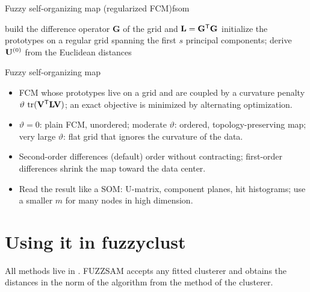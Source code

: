 \begin{algobox}{Fuzzy self-organizing map (regularized FCM)}{fsom}
\begin{algorithm}[H]
build the difference operator $\mathbf{G}$ of the grid and $\mathbf{L}=\mathbf{G}^{\mathsf{T}}\mathbf{G}$\;
initialize the prototypes on a regular grid spanning the first $s$ principal components; derive $\mathbf{U}^{(0)}$ from the Euclidean distances\;
\end{algorithm}
\end{algobox}
\begin{summarybox}{Fuzzy self-organizing map}
\begin{itemize}
  \item FCM whose prototypes live on a grid and are coupled by a curvature penalty $\vartheta\,\operatorname{tr}(\mathbf{V}^{\mathsf{T}}\mathbf{L}\mathbf{V})$; an exact objective is minimized by alternating optimization.
  \item $\vartheta=0$: plain FCM, unordered; moderate $\vartheta$: ordered, topology-preserving map; very large $\vartheta$: flat grid that ignores the curvature of the data.
  \item Second-order differences (default) order without contracting; first-order differences shrink the map toward the data center.
  \item Read the result like a SOM: U-matrix, component planes, hit histograms; use a smaller $m$ for many nodes in high dimension.
\end{itemize}
\end{summarybox}

\section{Using it in fuzzyclust}\label{sec:viz:api}

All methods live in . FUZZSAM accepts any fitted  clusterer and obtains the distances in the norm of the algorithm from the  method of the clusterer.

